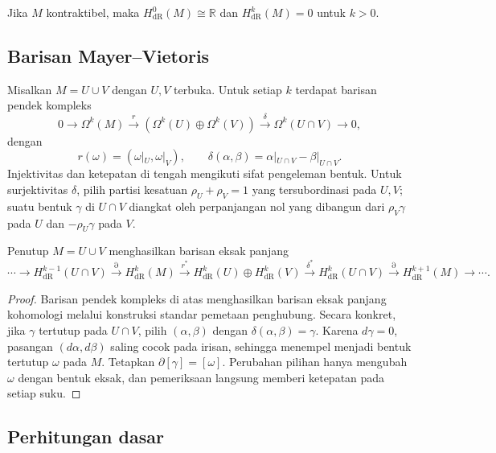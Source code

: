 \begin{Korollar}\label{o011-br-cor-contractible}
Jika $M$ kontraktibel, maka $H^0_{\mathrm{dR}}(M)\cong\mathbb R$ dan
$H^k_{\mathrm{dR}}(M)=0$ untuk $k>0$.
\end{Korollar}

\subsection{Barisan Mayer--Vietoris}

Misalkan $M=U\cup V$ dengan $U,V$ terbuka. Untuk setiap $k$ terdapat barisan
pendek kompleks
\[
0\longrightarrow\Omega^k(M)
\xrightarrow{r}(\Omega^k(U)\oplus\Omega^k(V))
\xrightarrow{\delta}\Omega^k(U\cap V)
\longrightarrow0,
\]
dengan
\[
 r(\omega)=(\omega|_U,\omega|_V),
 \qquad \delta(\alpha,\beta)=\alpha|_{U\cap V}-\beta|_{U\cap V}.
\]
Injektivitas dan ketepatan di tengah mengikuti sifat pengeleman bentuk. Untuk
surjektivitas $\delta$, pilih partisi kesatuan $\rho_U+\rho_V=1$ yang
tersubordinasi pada $U,V$; suatu bentuk $\gamma$ di $U\cap V$ diangkat oleh
perpanjangan nol yang dibangun dari $\rho_V\gamma$ pada $U$ dan
$-\rho_U\gamma$ pada $V$.

\begin{Theorem}\label{o011-br-thm-mv}
Penutup $M=U\cup V$ menghasilkan barisan eksak panjang
\[
\cdots\longrightarrow H^{k-1}_{\mathrm{dR}}(U\cap V)
\xrightarrow{\partial}H^k_{\mathrm{dR}}(M)
\xrightarrow{r^*}H^k_{\mathrm{dR}}(U)\oplus H^k_{\mathrm{dR}}(V)
\xrightarrow{\delta^*}H^k_{\mathrm{dR}}(U\cap V)
\xrightarrow{\partial}H^{k+1}_{\mathrm{dR}}(M)
\longrightarrow\cdots.
\]
\end{Theorem}

\begin{proof}
Barisan pendek kompleks di atas menghasilkan barisan eksak panjang kohomologi
melalui konstruksi standar pemetaan penghubung. Secara konkret, jika
$\gamma$ tertutup pada $U\cap V$, pilih $(\alpha,\beta)$ dengan
$\delta(\alpha,\beta)=\gamma$. Karena $d\gamma=0$, pasangan
$(d\alpha,d\beta)$ saling cocok pada irisan, sehingga menempel menjadi bentuk
tertutup $\omega$ pada $M$. Tetapkan $\partial[\gamma]=[\omega]$. Perubahan
pilihan hanya mengubah $\omega$ dengan bentuk eksak, dan pemeriksaan langsung
memberi ketepatan pada setiap suku.
\end{proof}

\subsection{Perhitungan dasar}

